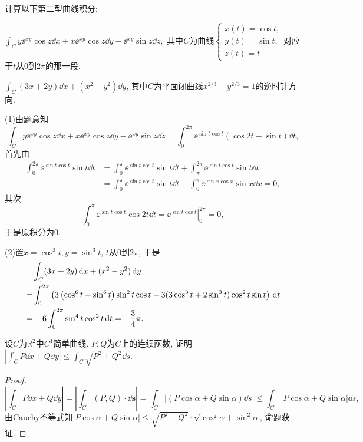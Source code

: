 \begin{quiza}
\woe 计算以下第二型曲线积分:
\begin{quizs}
\item \(\int_{C}y\ee^{xy}\cos z\dd x+x\ee^{xy}\cos z\dd y-\ee^{xy}\sin z\dd z,\) 其中\(C\)为曲线\(\begin{cases}
x(t)=\cos t,\\y(t)=\sin t,\\z(t)=t
\end{cases}\)对应于\(t\)从\(0\)到\(2\pi\)的那一段.
\item \(\int_C (3x+2y)\dd x+(x^2-y^2)\dd y\), 其中\(C\)为平面闭曲线\(x^{2/3}+y^{2/3}=1\)的逆时针方向.
\end{quizs}
\begin{solution}
(1)由题意知\[\int_{C}y\ee^{xy}\cos z\dd x+x\ee^{xy}\cos z\dd y-\ee^{xy}\sin z\dd z=\int_{0}^{2\pi}\ee^{\sin t\cos t}\left(\cos 2t-\sin t\right)\dd t,\]首先由
\[\begin{split}
\int_{0}^{2\pi}\ee^{\sin t\cos t}\sin t\dd t&=\int_{0}^{\pi}\ee^{\sin t\cos t}\sin t\dd t+\int_{\pi}^{2 \pi}\ee^{\sin t\cos t}\sin t\dd t\\&=\int_{0}^{\pi}\ee^{\sin t\cos t}\sin t\dd t-\int_{0}^{\pi}\ee^{\sin x\cos x}\sin x\dd x=0,\end{split}\]其次\[\int_{0}^{\pi}\ee^{\sin t\cos t}\cos 2t\dd t=\left.\ee^{\sin t\cos t}\right|^{2\pi}_0=0,\]于是原积分为0.

(2)置\(x=\cos^3t,y=\sin^3t\), \(t\)从\(0\)到\(2\pi\), 于是
\[\begin{split}
&\int_C (3x+2y)\,\mathrm{d} x+(x^2-y^2)\,\mathrm{d} y\\
=&\int_{0}^{2\pi}\left(3\left(\cos^6t-\sin^6t\right)\sin^2t\cos t-3(3\cos^3t+2\sin^3t)\cos^2t\sin t\right)\,\mathrm{d} t\\
=&-6\int_{0}^{2\pi}\sin^4t\cos^2t\,\mathrm{d} t=-\frac{3}{4}\pi.\qedhere
\end{split}\]
\end{solution}
\woe 设\(C\)为\(\mathbb{R}^2\)中\(C^1\)简单曲线. \(P,Q\)为\(C\)上的连续函数, 证明\(\left|\int_C P\dd x+Q\dd y\right|\leqslant \int_C\sqrt{P^2+Q^2}\dd s\). 
\begin{proof}

\[
\left|\int_{C}P\dd x+Q\dd y\right|=\left|\int_C\left(P,Q\right)\cdot \dd \boldsymbol{s}\right|=\int_C\left|\left(P\cos\alpha+Q\sin\alpha\right)\dd s\right|\leqslant\int_C\left|P\cos\alpha+Q\sin\alpha\right|\dd s,\]由Cauchy不等式知\(\left|P\cos\alpha+Q\sin\alpha\right|\leqslant\sqrt{P^2+Q^2}\cdot\sqrt{\cos^2\alpha+\sin^2\alpha}\), 命题获证.
\end{proof}
\end{quiza}
